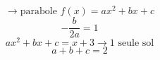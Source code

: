 \documentclass{article}
\begin{document}
\[
\rightarrow \text{parabole } f(x) = ax^2 + bx + c
\]
\[
-\frac{b}{2a} = 1
\]
\[
ax^2 + bx + c = x+3 \rightarrow \text{1 seule sol}
\]
\[
a + b + c = 2
\]
\end{document}
